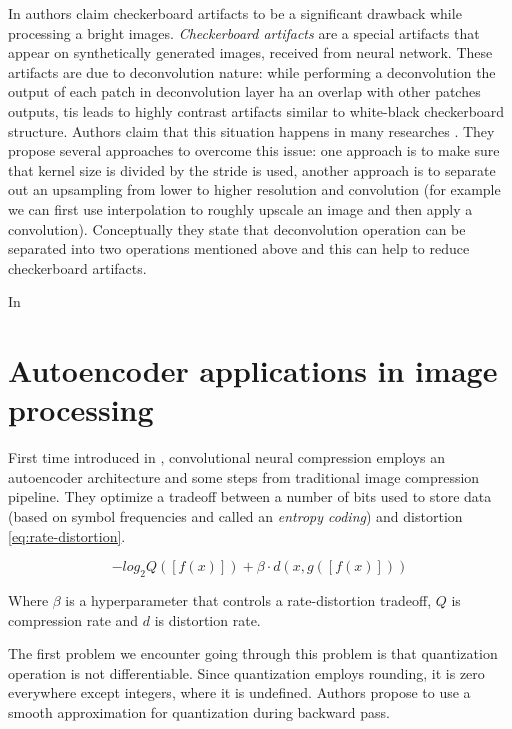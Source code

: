 In \cite{odena_deconvolution_2016} authors claim checkerboard artifacts to be a significant drawback while processing a bright images. \textit{Checkerboard artifacts} are a special artifacts that appear on synthetically generated images, received from neural network. These artifacts are due to deconvolution nature: while performing a deconvolution the output of each patch in deconvolution layer ha an overlap with other patches outputs, tis leads to highly contrast artifacts similar to white-black checkerboard structure. Authors claim that this situation happens in many researches \cite{dumoulin_adversarially_2017,donahue_adversarial_2017,salimans_improved_2016,radford_unsupervised_2016}. They propose several approaches to overcome this issue: one approach is to make sure that kernel size is divided by the stride is used, another approach is to separate out an upsampling from lower to higher resolution and convolution (for example we can first use interpolation to roughly upscale an image and then apply a convolution). Conceptually they state that deconvolution operation can be separated into two operations mentioned above and this can help to reduce checkerboard artifacts.

In

\section{Autoencoder applications in image processing}

First time introduced in \cite{toderici_full_2017}, convolutional neural compression employs an autoencoder architecture and some steps from traditional image compression pipeline. They optimize a tradeoff between a number of bits used to store data (based on symbol frequencies and called an \textit{entropy coding}) and distortion \ref{eq:rate-distortion}.

\begin{equation}
    \label{eq:rate-distortion}
    − log_2 Q ([f (x)]) + \beta · d (x, g([f (x)]))
\end{equation}

Where $\beta$ is a hyperparameter that controls a rate-distortion tradeoff, $Q$ is compression rate and $d$ is distortion rate.

The first problem we encounter going through this problem is that quantization operation is not differentiable. Since quantization employs rounding, it is zero everywhere except integers, where it is undefined. Authors propose to use a smooth approximation for quantization during backward pass.

